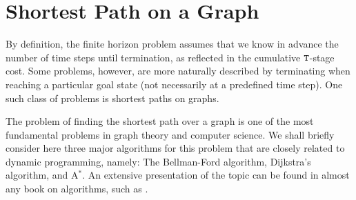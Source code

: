 



\section{Shortest Path on a Graph
}
By definition, the finite horizon problem assumes that we know in advance the number of time steps until termination, as reflected in the cumulative ${\tt T}$-stage cost. Some problems, however, are more naturally described by terminating when reaching a particular goal state (not necessarily at a predefined time step). One such class of problems is shortest paths on graphs.

The problem of finding the shortest path over a graph is one of the most fundamental problems in graph theory and computer science. We shall briefly consider here three major algorithms for this problem that are closely related to dynamic programming, namely: The Bellman-Ford algorithm, Dijkstra's algorithm, and A$^*$.
An extensive presentation of the topic can be found in almost any book on algorithms, such as \cite{cormen2009introduction,KleinbergTardos06,DasguptaPapadimitriouVazirani08}.

